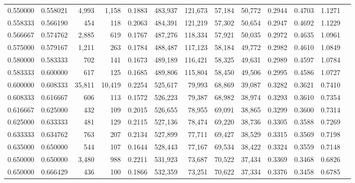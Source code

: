 \begin{tabular}{rrrrrrrrrrrrr}
0.550000 & 0.558021 &  4,993 &  1,158 &                                     0.1883 & 483,937 & 121,673 &  57,184 &  50,772 & 0.2944 & 0.4703 & 1.1271 \\
0.558333 & 0.566190 &    454 &    118 &                                     0.2063 & 484,391 & 121,219 &  57,302 &  50,654 & 0.2947 & 0.4692 & 1.1229 \\
0.566667 & 0.574762 &  2,885 &    619 &                                     0.1767 & 487,276 & 118,334 &  57,921 &  50,035 & 0.2972 & 0.4635 & 1.0961 \\
0.575000 & 0.579167 &  1,211 &    263 &                                     0.1784 & 488,487 & 117,123 &  58,184 &  49,772 & 0.2982 & 0.4610 & 1.0849 \\
0.580000 & 0.583333 &    702 &    141 &                                     0.1673 & 489,189 & 116,421 &  58,325 &  49,631 & 0.2989 & 0.4597 & 1.0784 \\
0.583333 & 0.600000 &    617 &    125 &                                     0.1685 & 489,806 & 115,804 &  58,450 &  49,506 & 0.2995 & 0.4586 & 1.0727 \\
0.600000 & 0.608333 & 35,811 & 10,419 &                                     0.2254 & 525,617 &  79,993 &  68,869 &  39,087 & 0.3282 & 0.3621 & 0.7410 \\
0.608333 & 0.616667 &    606 &    113 &                                     0.1572 & 526,223 &  79,387 &  68,982 &  38,974 & 0.3293 & 0.3610 & 0.7354 \\
0.616667 & 0.625000 &    432 &    109 &                                     0.2015 & 526,655 &  78,955 &  69,091 &  38,865 & 0.3299 & 0.3600 & 0.7314 \\
0.625000 & 0.633333 &    481 &    129 &                                     0.2115 & 527,136 &  78,474 &  69,220 &  38,736 & 0.3305 & 0.3588 & 0.7269 \\
0.633333 & 0.634762 &    763 &    207 &                                     0.2134 & 527,899 &  77,711 &  69,427 &  38,529 & 0.3315 & 0.3569 & 0.7198 \\
0.635000 & 0.650000 &    544 &    107 &                                     0.1644 & 528,443 &  77,167 &  69,534 &  38,422 & 0.3324 & 0.3559 & 0.7148 \\
0.650000 & 0.650000 &  3,480 &    988 &                                     0.2211 & 531,923 &  73,687 &  70,522 &  37,434 & 0.3369 & 0.3468 & 0.6826 \\
0.650000 & 0.666429 &    436 &    100 &                                     0.1866 & 532,359 &  73,251 &  70,622 &  37,334 & 0.3376 & 0.3458 & 0.6785 \\

\end{tabular}

